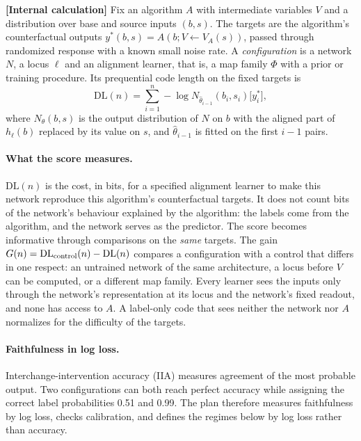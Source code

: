 \documentclass[11pt,a4paper]{article}
\newcommand{\DL}{\mathrm{DL}}
\newcommand{\evl}[2]{{\small\bfseries\color{#1}[#2]}}
\newcommand{\LCalc}{\evl{ccalc}{Internal calculation}}
\begin{document}
\LCalc{} Fix an algorithm $A$ with intermediate variables $V$ and a
distribution over base and source inputs $(b,s)$. The targets are the
algorithm's counterfactual outputs $y^*(b,s)=A(b;V\leftarrow V_A(s))$,
passed through randomized response with a known small noise rate. A
\emph{configuration} is a network $N$, a locus $\ell$ and an alignment
learner, that is, a map family $\Phi$ with a prior or training procedure.
Its prequential code length on the fixed targets is
\begin{equation}
\DL(n)=\sum_{i=1}^n-\log N_{\hat\theta_{i-1}}(b_i,s_i)\bigl[y^*_i\bigr],
\label{eq:dlh}
\end{equation}
where $N_\theta(b,s)$ is the output distribution of $N$ on $b$ with the
aligned part of $h_\ell(b)$ replaced by its value on $s$, and
$\hat\theta_{i-1}$ is fitted on the first $i-1$ pairs.

\paragraph{What the score measures.} $\DL(n)$ is the cost, in bits, for a
specified alignment learner to make this network reproduce this
algorithm's counterfactual targets. It does not count bits of the
network's behaviour explained by the algorithm: the labels come from the
algorithm, and the network serves as the predictor. The score becomes
informative through comparisons on the \emph{same} targets. The gain
$G(n)=\DL_{\rm control}(n)-\DL(n)$ compares a configuration with a control
that differs in one respect: an untrained network of the same
architecture, a locus before $V$ can be computed, or a different map
family. Every learner sees the inputs only through the network's
representation at its locus and the network's fixed readout, and none has
access to $A$. A label-only code that sees neither the network nor $A$
normalizes for the difficulty of the targets.

\paragraph{Faithfulness in log loss.} Interchange-intervention accuracy
(IIA) measures agreement of the most probable output. Two configurations
can both reach perfect accuracy while assigning the correct label
probabilities 0.51 and 0.99. The plan therefore measures faithfulness by
log loss, checks calibration, and defines the regimes below by log loss
rather than accuracy.
\end{document}
